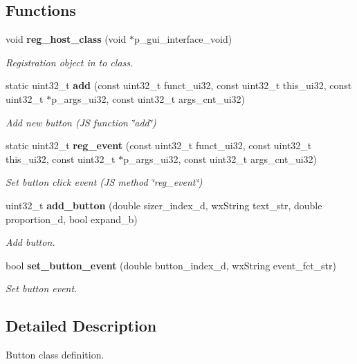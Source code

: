 \subsection*{Functions}
\begin{DoxyCompactItemize}
\item 
void \textbf{ reg\+\_\+host\+\_\+class} (void $\ast$p\+\_\+gui\+\_\+interface\+\_\+void)
\begin{DoxyCompactList}\small\item\em Registration object in to class. \end{DoxyCompactList}\item 
static uint32\+\_\+t \textbf{ add} (const uint32\+\_\+t funct\+\_\+ui32, const uint32\+\_\+t this\+\_\+ui32, const uint32\+\_\+t $\ast$p\+\_\+args\+\_\+ui32, const uint32\+\_\+t args\+\_\+cnt\+\_\+ui32)
\begin{DoxyCompactList}\small\item\em Add new button (JS function \char`\"{}add\char`\"{}) \end{DoxyCompactList}\item 
static uint32\+\_\+t \textbf{ reg\+\_\+event} (const uint32\+\_\+t funct\+\_\+ui32, const uint32\+\_\+t this\+\_\+ui32, const uint32\+\_\+t $\ast$p\+\_\+args\+\_\+ui32, const uint32\+\_\+t args\+\_\+cnt\+\_\+ui32)
\begin{DoxyCompactList}\small\item\em Set button click event (JS method \char`\"{}reg\+\_\+event\char`\"{}) \end{DoxyCompactList}\item 
uint32\+\_\+t \textbf{ add\+\_\+button} (double sizer\+\_\+index\+\_\+d, wx\+String text\+\_\+str, double proportion\+\_\+d, bool expand\+\_\+b)
\begin{DoxyCompactList}\small\item\em Add button. \end{DoxyCompactList}\item 
bool \textbf{ set\+\_\+button\+\_\+event} (double button\+\_\+index\+\_\+d, wx\+String event\+\_\+fct\+\_\+str)
\begin{DoxyCompactList}\small\item\em Set button event. \end{DoxyCompactList}\end{DoxyCompactItemize}


\subsection{Detailed Description}
Button class definition. 

